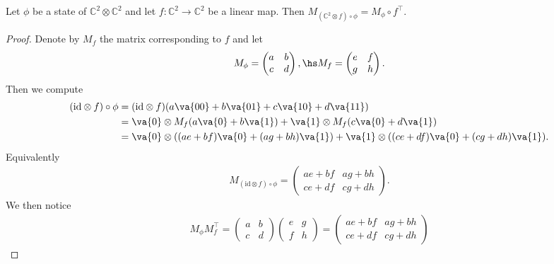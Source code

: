 \documentclass{article}
\begin{document}
\begin{claim*}[b]
  Let $\phi$ be a state of $\mathbb C^2\otimes\mathbb C^2$ and let
  $f:\mathbb C^2\to\mathbb C^2$ be a linear map.
  Then $M_{(\mathbb C^2\otimes f)\circ\phi} =M_\phi\circ f^\top$.
  \begin{proof}
    Denote by $M_f$ the matrix corresponding to $f$ and let
    \begin{align*}
      M_\phi =
      \begin{pmatrix}
        a & b \\
        c & d
      \end{pmatrix},\hs
      M_f =
      \begin{pmatrix}
        e & f \\
        g & h
      \end{pmatrix}.
    \end{align*}
    Then we compute
    \begin{align*}
      (\text{id}\otimes f)\circ\phi
      &= (\text{id}\otimes f)(a\va{00}+b\va{01}+c\va{10}+d\va{11})\\
      &= \va{0}\otimes M_f(a\va{0}+b\va{1})+\va{1}\otimes M_f(c\va{0}+d\va{1})\\
      &= \va{0}\otimes((ae+bf)\va{0}+(ag+bh)\va{1})+
      \va{1}\otimes((ce+df)\va{0}+(cg+dh)\va{1}).
    \end{align*}
    Equivalently
    \begin{align*}
      M_{(\text{id} \otimes f)\circ\phi} =
      \begin{pmatrix}
        ae+bf & ag+bh \\
        ce+df & cg+dh
      \end{pmatrix}.
    \end{align*}
    We then notice
    \begin{align*}
      M_\phi M_f^\top =
      \begin{pmatrix}
        a & b \\
        c & d
      \end{pmatrix}
      \begin{pmatrix}
        e & g \\
        f & h
      \end{pmatrix}
      =
      \begin{pmatrix}
        ae+bf & ag+bh \\
        ce+df & cg+dh
      \end{pmatrix}
    \end{align*}
  \end{proof}
\end{claim*}
\end{document}
